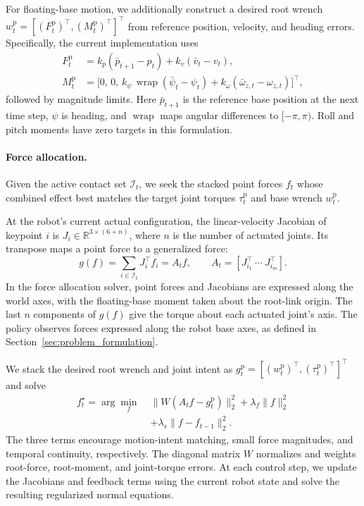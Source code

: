 For floating-base motion, we additionally construct a desired root wrench $w_t^{\mathrm{p}}=[(F_t^{\mathrm{p}})^\top,(M_t^{\mathrm{p}})^\top]^\top$ from reference position, velocity, and heading errors. Specifically, the current implementation uses
\begin{align}
    F_t^{\mathrm{p}} &=
    k_p(\bar{p}_{t+1}-p_t)+k_v(\bar{v}_t-v_t), \\
    M_t^{\mathrm{p}} &=
    \bigl[0,\,0,\,
    k_\psi\,\operatorname{wrap}(\bar{\psi}_t-\psi_t)
    +k_\omega(\bar{\omega}_{z,t}-\omega_{z,t})\bigr]^\top,
    \label{eq:root_intent}
\end{align}
followed by magnitude limits. Here $\bar{p}_{t+1}$ is the reference base position at the next time step, $\psi$ is heading, and $\operatorname{wrap}$ maps angular differences to $[-\pi,\pi)$. Roll and pitch moments have zero targets in this formulation.

\paragraph{Force allocation.}
Given the active contact set $\mathcal{I}_t$, we seek the stacked point forces $f_t$ whose combined effect best matches the target joint torques $\tau_t^{\mathrm{p}}$ and base wrench $w_t^{\mathrm{p}}$.

At the robot's current actual configuration, the linear-velocity Jacobian of keypoint $i$ is $J_i\in\mathbb{R}^{3\times(6+n)}$, where $n$ is the number of actuated joints. Its transpose maps a point force to a generalized force:
\begin{equation}
    g(f)=\sum_{i\in\mathcal{I}_t}J_i^\top f_i
    = A_t f,
    \qquad
    A_t=[J_{i_1}^\top\ \cdots\ J_{i_m}^\top].
    \label{eq:jacobian_force}
\end{equation}
In the force allocation solver, point forces and Jacobians are expressed along the world axes, with the floating-base moment taken about the root-link origin. The last $n$ components of $g(f)$ give the torque about each actuated joint's axis. The policy observes forces expressed along the robot base axes, as defined in Section~\ref{sec:problem_formulation}.

We stack the desired root wrench and joint intent as $g_t^{\mathrm{p}}=[(w_t^{\mathrm{p}})^\top, (\tau_t^{\mathrm{p}})^\top]^\top$ and solve
\begin{equation}
    \begin{aligned}
    f_t^\star=\arg\min_f\; &\|W(A_t f-g_t^{\mathrm{p}})\|_2^2
        +\lambda_f\|f\|_2^2 \\
        &+\lambda_s\|f-f_{t-1}\|_2^2.
    \end{aligned}
    \label{eq:force_allocation}
\end{equation}
The three terms encourage motion-intent matching, small force magnitudes, and temporal continuity, respectively. The diagonal matrix $W$ normalizes and weights root-force, root-moment, and joint-torque errors. At each control step, we update the Jacobians and feedback terms using the current robot state and solve the resulting regularized normal equations.

